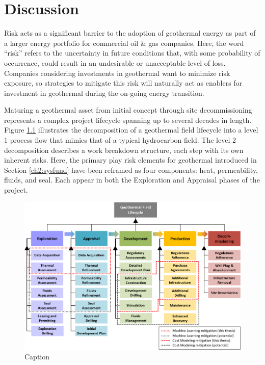 \chapter{Discussion}\label{ch7:discuss}

Risk acts as a significant barrier to the adoption of geothermal energy as part of a larger energy portfolio for commercial oil \& gas companies. Here, the word “risk” refers to the uncertainty in future conditions that, with some probability of occurrence, could result in an undesirable or unacceptable level of loss.  Companies considering investments in geothermal want to minimize risk exposure, so strategies to mitigate this risk will naturally act as enablers for investment in geothermal during the on-going energy transition.

Maturing a geothermal asset from initial concept through site decommissioning represents a complex project lifecycle spanning up to several decades in length. Figure \ref{fig:geothermal_field_lifecycle} illustrates the decomposition of a geothermal field lifecycle into a level 1 process flow that mimics that of a typical hydrocarbon field. The level 2 decomposition describes a work breakdown structure, each step with its own inherent risks. Here, the primary play risk elements for geothermal introduced in Section \ref{ch2:sysfund} have been reframed as four components: heat, permeability, fluids, and seal. Each appear in both the Exploration and Appraisal phases of the project. 

\begin{figure}[!htp]
\centering
\includegraphics[width=\textwidth]{templates/images/Figure-SystemDecomposition.png}
\caption[Geothermal field lifecycle]{Caption}
\label{fig:geothermal_field_lifecycle}
\end{figure}


